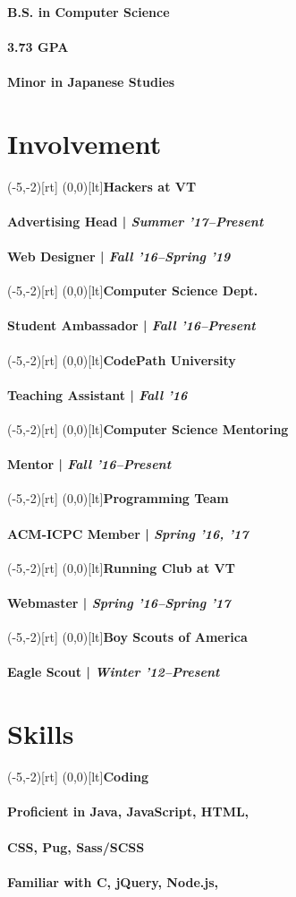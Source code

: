 \documentclass[9pt]{extarticle}
\newcommand{\ChronoParagraph}[2]{
    \paragraph{#1 | {\footnotesize\textit{#2}}}
}
\newcommand{\Subsection}[2]{
    \makebox(-5,-2)[rt]{}
    \makebox(0,0)[lt]{\normalsize\bfseries\color{subsection}#1}
    \vspace{1em}
    #2
}
\begin{document}
\begin{paracol}{2}
\begin{rightcolumn}
{                \paragraph{B.S. in Computer Science}
                \paragraph{3.73 GPA}
                \paragraph{Minor in Japanese Studies}
            }
        \vfill
        \section{Involvement}
            \Subsection{Hackers at VT}{
                \ChronoParagraph{Advertising Head}{Summer '17--Present}
                \ChronoParagraph{Web Designer}{Fall '16--Spring '19}
            }
            \vfill
            \Subsection{Computer Science Dept.}{
                \ChronoParagraph{Student Ambassador}{Fall '16--Present}
            }
            \vfill
            \Subsection{CodePath University}{
                \ChronoParagraph{Teaching Assistant}{Fall '16}
            }
            \vfill
            \Subsection{Computer Science Mentoring}{
                \ChronoParagraph{Mentor}{Fall '16--Present}
            }
            \vfill
            \Subsection{Programming Team}{
                \ChronoParagraph{ACM-ICPC Member}{Spring '16, '17}
            }
            \vfill
            \Subsection{Running Club at VT}{
                \ChronoParagraph{Webmaster}{Spring '16--Spring '17}
            }
            \vfill
            \Subsection{Boy Scouts of America}{
                \ChronoParagraph{Eagle Scout}{Winter '12--Present}
            }
        \vfill
        \section{Skills}
            \Subsection{Coding}{
                \paragraph{Proficient in Java, JavaScript, HTML,}
                \paragraph{CSS, Pug, Sass/SCSS}
                \paragraph{Familiar with C, jQuery, Node.js,}
}
\end{rightcolumn}
\end{paracol}
\end{document}
